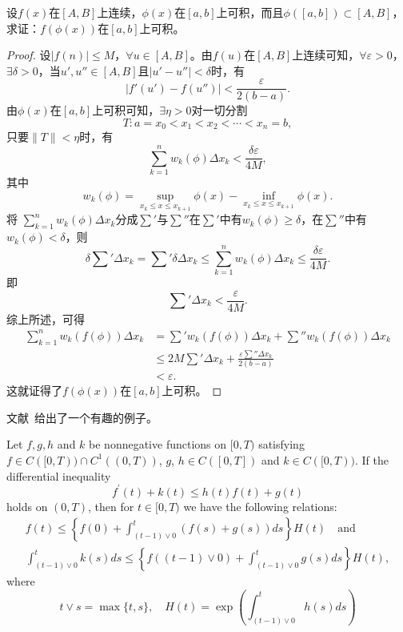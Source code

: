 \begin{example}
 设$f(x)$在$[A,B]$上连续，$\phi(x)$在$[a,b]$上可积，而且$\phi([a,b])\subset[A,B]$，求证：$f(\phi(x))$在$[a,b]$上可积。
\end{example}

\begin{proof}
   设$|f(n)|\leq M$，$\forall u\in[A,B]$。由$f(u)$在$[A,B]$上连续可知，$\forall\varepsilon>0$，$\exists\delta>0$，当$u',u''\in[A,B]$且$|u'-u''|<\delta$时，有
  $$|f'(u')-f(u'')|<\frac{\varepsilon}{2(b-a)}.$$
  由$\phi(x)$在$[a,b]$上可积可知，$\exists\eta>0$对一切分割
  $$T:a=x_0<x_1<x_2<\cdots<x_n=b,$$
  只要$\|T\|<\eta$时，有
  $$\sum_{k=1}^nw_k(\phi)\Delta x_k<\frac{\delta\varepsilon}{4M},$$
  其中$$w_k(\phi)=\sup_{x_k\leq x\leq x_{k+1}}\phi(x)-\inf_{x_k\leq x\leq x_{k+1}}\phi(x).$$
  将 $\sum\limits_{k=1}^nw_k(\phi)\Delta x_k$分成$\sum\limits'$与$\sum\limits''$在$\sum\limits'$中有$w_k(\phi)\geq\delta$，在$\sum\limits''$中有$w_k(\phi)<\delta$，则
  $$\delta\sum'\Delta x_k=\sum'\delta\Delta x_k\leq\sum_{k=1}^nw_k(\phi)\Delta x_k\leq\frac{\delta\varepsilon}{4M}.$$
  即$$\sum'\Delta x_k<\frac{\varepsilon}{4M}.$$
  综上所述，可得
  \begin{align*}
  \sum_{k=1}^nw_k(f(\phi))\Delta x_k&=\sum'w_k(f(\phi))\Delta x_k+\sum''w_k(f(\phi))\Delta x_k\\
  &\leq2M\sum'\Delta x_k+\frac{\varepsilon\sum''\Delta x_k}{2(b-a)}\\
  &<\varepsilon.
  \end{align*}
  这就证得了$f(\phi(x))$在$[a,b]$上可积。
\end{proof}  

文献~\cite[Lemma~4.3]{Nagai1995}给出了一个有趣的例子。

\begin{example}
  Let $f, g, h$ and $k$ be nonnegative functions on $[0, T)$ satisfying $f \in C([0, T) )\cap C^1((0, T))$, $g$, $h \in C([0, T])$ and $k \in C([0, T))$. 
  If the differential inequality
$$
f^{\prime}(t)+k(t) \leq h(t) f(t)+g(t)
$$
holds on $(0, T)$, 
then for $t \in[0, T)$ we have the following relations:
$$
\begin{gathered}
f(t) \leq\left\{f(0)+\int_{(t-1) \vee 0}^t(f(s)+g(s)) d s\right\} H(t)\quad\text{and} \\
\int_{(t-1) \vee 0}^t k(s) d s \leq\left\{f((t-1) \vee 0)+\int_{(t-1) \vee 0}^t g(s) d s\right\} H(t),
\end{gathered}
$$
where
$$
t \vee s=\max \{t, s\}, \quad H(t)=\exp \left(\int_{(t-1) \vee 0}^t h(s) d s\right)
$$
\end{example}

